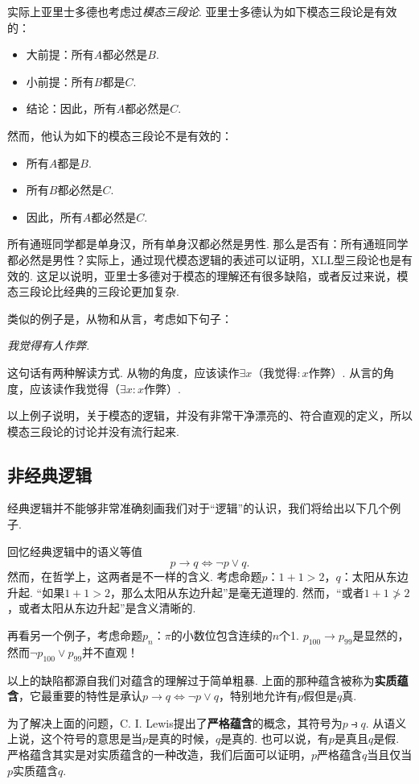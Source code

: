 实际上亚里士多德也考虑过\emph{模态三段论}. 亚里士多德认为如下模态三段论是有效的：%
\begin{itemize}
    \item 大前提：所有$A$都必然是$B$.
    \item 小前提：所有$B$都是$C$.
    \item 结论：因此，所有$A$都必然是$C$.
\end{itemize}
然而，他认为如下的模态三段论不是有效的：
\begin{itemize}
\item 所有$A$都是$B$.
\item 所有$B$都必然是$C$.
\item 因此，所有$A$都必然是$C$.
\end{itemize}
所有通班同学都是单身汉，所有单身汉都必然是男性. 那么是否有：所有通班同学都必然是男性？实际上，通过现代模态逻辑的表述可以证明，XLL型三段论也是有效的. 这足以说明，亚里士多德对于模态的理解还有很多缺陷，或者反过来说，模态三段论比经典的三段论更加复杂.
    
 类似的例子是，从物和从言，考虑如下句子：
\begin{center}
\itshape 我觉得有人作弊.
\end{center}
这句话有两种解读方式. 从物的角度，应该读作$\exists x$（我觉得$:x$作弊）. 从言的角度，应该读作我觉得（$\exists x:x$作弊）.

以上例子说明，关于模态的逻辑，并没有非常干净漂亮的、符合直观的定义，所以模态三段论的讨论并没有流行起来. 
    
\subsection{非经典逻辑}
经典逻辑并不能够非常准确刻画我们对于“逻辑”的认识，我们将给出以下几个例子. 

回忆经典逻辑中的语义等值
        \[p\to q\iff\neg p\vee q.\]
然而，在哲学上，这两者是不一样的含义. 考虑命题$p$：$1+1>2$，$q$：太阳从东边升起. “如果$1+1>2$，那么太阳从东边升起”是毫无道理的. 然而，“或者$1+1\not>2$，或者太阳从东边升起”是含义清晰的.

再看另一个例子，考虑命题$p_n$：$\pi$的小数位包含连续的$n$个1. $p_{100}\to p_{99}$是显然的，然而$\neg p_{100}\vee p_{99}$并不直观！
    
以上的缺陷都源自我们对蕴含的理解过于简单粗暴. 上面的那种蕴含被称为\textbf{实质蕴含}，它最重要的特性是承认$p\rightarrow q \iff
\lnot {p}\vee q$，特别地允许有$p$假但是$q$真.

为了解决上面的问题，C. I. Lewis提出了\textbf{严格蕴含}的概念，其符号为$p\strictif q$. 从语义上说，这个符号的意思是当$p$是真的时候，$q$是真的. 也可以说，有$p$是真且$q$是假. 严格蕴含其实是对实质蕴含的一种改造，我们后面可以证明，$p$严格蕴含$q$当且仅当 $p$实质蕴含$q$.
    
